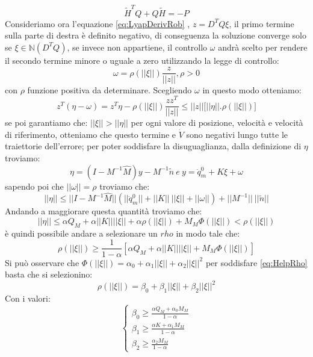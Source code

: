 \begin{equation*}
\tilde{H}^TQ+Q\tilde{H} = -P
\end{equation*}
Consideriamo ora l'equazione \ref{eq:LyapDerivRob} , $z = D^TQ\xi$, il primo termine sulla parte di destra è definito negativo, di conseguenza la soluzione converge solo se $\xi \in \mathbb{N}(D^TQ)$, se invece non appartiene, il controllo $\omega$ andrà scelto per rendere il secondo termine minore o uguale a zero utilizzando la legge di controllo:
\begin{equation}
\omega = \rho(||\xi||)\frac{z}{||z||}, \rho >0
\end{equation}
con $\rho$ funzione positiva da determinare. Scegliendo $\omega$ in questo modo otteniamo:
\begin{equation*}
z^T(\eta-\omega) = z^T\eta - \rho(||\xi||)\frac{zz^T}{||z||} \le ||z||\big[||\eta||.\rho(||\xi||)\big]
\end{equation*}
se poi garantiamo che: $||\xi||>||\eta||$ per ogni valore di posizione, velocità e velocità di riferimento, otteniamo che questo termine e $\dot{V}$ sono negativi lungo tutte le traiettorie dell'errore; per poter soddisfare la disuguaglianza, dalla definizione di $\eta$ troviamo:
\begin{equation}
\eta = (I-M^{-1}\hat{M})y-M^{-1}\tilde{n} \ e \ y = \ddot{q}^0_m + K\xi+\omega
\end{equation}
sapendo poi che $||\omega|| = \rho$ troviamo che:
\begin{equation*}
||\eta|| \le ||I-M^{-1}\hat{M}|| (||\ddot{q}_m^0 ||+||K||\  ||\xi||+||\omega||)+||M^{-1}|| \ ||\tilde{n}||
\end{equation*}
Andando a maggiorare questa quantità troviamo che:
\begin{equation}
||\eta|| \le \alpha Q_M + \alpha ||K|| || \xi || + \alpha\rho(||\xi||)+M_M\Phi(||\xi||) < \rho(||\xi||)
\end{equation}
è quindi possibile andare a selezionare un $rho$ in modo tale che:
\begin{equation}
\rho(||\xi||) \ge \frac{1}{1-\alpha} [\alpha Q_M+\alpha ||K|| ||\xi||+M_M\Phi(||\xi||)]
\label{eq:HelpRho}
\end{equation}
Si può osservare che $\Phi(||\xi||) = \alpha_0+\alpha_1||\xi||+\alpha_2||\xi||^2$ per soddisfare \ref{eq:HelpRho} basta che si selezionino:
\begin{equation*}
\rho(||\xi||) = \beta_0 + \beta_1||\xi||+\beta_2||\xi||^2
\end{equation*}
Con i valori:
\begin{equation*}
\begin{cases}
\beta_0 \ge \frac{\alpha Q_M+\alpha_0M_M}{1-\alpha}\\
 \beta_1 \ge \frac{\alpha K +\alpha_1 M_M}{1-\alpha}\\
 \beta_2 \ge \frac{\alpha_2M_M}{1-\alpha}
\end{cases}
\end{equation*}
